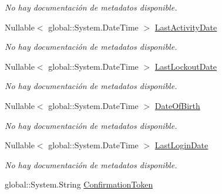\begin{DoxyCompactItemize}
\begin{DoxyCompactList}\small\item\em No hay documentación de metadatos disponible. \end{DoxyCompactList}\item 
Nullable$<$ global\-::\-System.\-Date\-Time $>$ \hyperlink{class_microsoft_1_1_samples_1_1_kinect_1_1_basic_interactions_1_1_users_aee708722af48c9a8d38f4570475c63e7}{Last\-Activity\-Date}
\begin{DoxyCompactList}\small\item\em No hay documentación de metadatos disponible. \end{DoxyCompactList}\item 
Nullable$<$ global\-::\-System.\-Date\-Time $>$ \hyperlink{class_microsoft_1_1_samples_1_1_kinect_1_1_basic_interactions_1_1_users_aef20184e56d733efb0aa7cb090ce65a6}{Last\-Lockout\-Date}
\begin{DoxyCompactList}\small\item\em No hay documentación de metadatos disponible. \end{DoxyCompactList}\item 
Nullable$<$ global\-::\-System.\-Date\-Time $>$ \hyperlink{class_microsoft_1_1_samples_1_1_kinect_1_1_basic_interactions_1_1_users_ae348bd15345f09217e97eb5922aa107d}{Date\-Of\-Birth}
\begin{DoxyCompactList}\small\item\em No hay documentación de metadatos disponible. \end{DoxyCompactList}\item 
Nullable$<$ global\-::\-System.\-Date\-Time $>$ \hyperlink{class_microsoft_1_1_samples_1_1_kinect_1_1_basic_interactions_1_1_users_a6c6f7606351fd3e59831dfafba8cc667}{Last\-Login\-Date}
\begin{DoxyCompactList}\small\item\em No hay documentación de metadatos disponible. \end{DoxyCompactList}\item 
global\-::\-System.\-String \hyperlink{class_microsoft_1_1_samples_1_1_kinect_1_1_basic_interactions_1_1_users_aca2d21b18151722f444b87ba3fbdb7ad}{Confirmation\-Token}

\end{DoxyCompactItemize}
